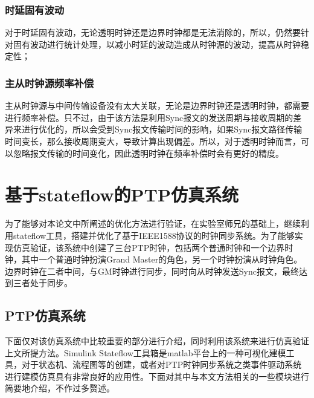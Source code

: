 \subsubsection{时延固有波动}
对于时延固有波动，无论透明时钟还是边界时钟都是无法消除的，所以，仍然要针对固有波动进行统计处理，以减小时延的波动造成从时钟源的波动，提高从时钟稳定性；

\subsubsection{主从时钟源频率补偿}
主从时钟源与中间传输设备没有太大关联，无论是边界时钟还是透明时钟，都需要进行频率补偿。只不过，由于该方法是利用Sync报文的发送周期与接收周期的差异来进行优化的，所以会受到Sync报文传输时间的影响，如果Sync报文路径传输时间变长，那么接收周期变大，导致计算出现偏差。所以，对于透明时钟而言，可以忽略报文传输的时间变化，因此透明时钟在频率补偿时会有更好的精度。

\section{基于stateflow的PTP仿真系统}
为了能够对本论文中所阐述的优化方法进行验证，在实验室师兄的基础上，继续利用stateflow工具，搭建并优化了基于IEEE1588协议的时钟同步系统。为了能够实现仿真验证，该系统中创建了三台PTP时钟，包括两个普通时钟和一个边界时钟，其中一个普通时钟扮演Grand Master的角色，另一个时钟扮演从时钟角色。边界时钟在二者中间，与GM时钟进行同步，同时向从时钟发送Sync报文，最终达到三者处于同步。

\subsection{PTP仿真系统}
下面仅对该仿真系统中比较重要的部分进行介绍，同时利用该系统来进行仿真验证上文所提方法。Simulink Stateflow工具箱是matlab平台上的一种可视化建模工具，对于状态机、流程图等的创建，或者对PTP时钟同步系统之类事件驱动系统进行建模仿真具有非常良好的应用性。下面对其中与本文方法相关的一些模块进行简要地介绍，不作过多赘述。


